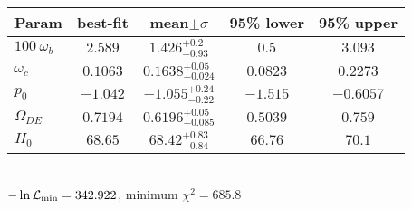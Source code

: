 \begin{tabular}{|l|c|c|c|c|} 
 \hline 
Param & best-fit & mean$\pm\sigma$ & 95\% lower & 95\% upper \\ \hline 
$100~\omega_{b }$ &$2.589$ & $1.426_{-0.93}^{+0.2}$ & $0.5$ & $3.093$ \\ 
$\omega_c$ &$0.1063$ & $0.1638_{-0.024}^{+0.05}$ & $0.0823$ & $0.2273$ \\ 
$p_{0 }$ &$-1.042$ & $-1.055_{-0.22}^{+0.24}$ & $-1.515$ & $-0.6057$ \\ 
$\Omega_{DE}$ &$0.7194$ & $0.6196_{-0.085}^{+0.05}$ & $0.5039$ & $0.759$ \\ 
$H_{0 }$ &$68.65$ & $68.42_{-0.84}^{+0.83}$ & $66.76$ & $70.1$ \\ 
\hline 
 \end{tabular} \\ 
$-\ln{\cal L}_\mathrm{min} =342.922$, minimum $\chi^2=685.8$ \\ 
